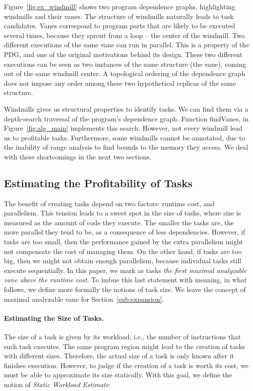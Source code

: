 \documentclass[sigplan,10pt,review,anonymous]{acmart}
\begin{document}
Figure~\ref{fig:ex_windmill} shows two program dependence graphs, highlighting
windmills and their vanes.
The structure of windmills naturally leads to task candidates.
Vanes correspond to program parts that are likely to be executed
several times, because they sprout from a loop -- the center of the windmill.
Two different executions of the same vane can run in parallel.
This is a property of the PDG, and one of the original motivations behind its
design.
These two different executions can be seen as two instances of the same
structure (the vane), coming out of the same windmill center.
A topological ordering of the dependence graph does not impose any order among
these two hypothetical replicas of the same structure.

Windmills gives us structural properties to identify tasks.
We can find them via a depth-search traversal of the program's dependence
graph.
Function \textsf{findVanes}, in Figure~\ref{fig:alg_main} implements this
search.
However, not every windmill lead us to profitable tasks.
Furthermore, some windmills cannot be annotated, due to the inability of
range analysis to find bounds to the memory they access.
We deal with these shortcomings in the next two sections.

\subsection{Estimating the Profitability of Tasks}
\label{sub:profit}

The benefit of creating tasks depend on two factors:
runtime cost, and parallelism.
This tension leads to a sweet spot in the size of tasks, where size is
measured as the amount of code they execute.
The smaller the tasks are, the more parallel they tend to be, as a consequence
of less dependencies.
However, if tasks are too small, then the performance gained by the extra
parallelism might not compensate the cost of managing them.
On the other hand, if tasks are too big, then we might not obtain enough
parallelism, because individual tasks still execute sequentially.
In this paper, we mark as tasks {\em the first maximal analyzable vane above the
runtime cost}.
To imbue this last statement with meaning, in what follows, we define more
formally the notions of task size.
We leave the concept of maximal analyzable vane for Section~\ref{sub:expansion}.

\paragraph{Estimating the Size of Tasks.}
The size of a task is given by its workload, i.e., the number of instructions 
that such task executes.
The same program region might lead to the creation of tasks with different sizes.
Therefore, the actual size of a task is only known after it finishes execution.
However, to judge if the creation of a task is worth its cost, we must be able to
approximate its size statically.
With this goal, we define the notion of {\em Static Workload Estimate}:
\end{document}
